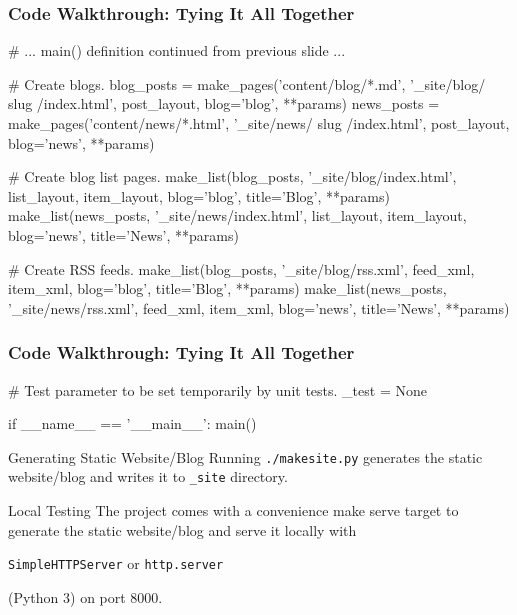 \documentclass{beamer}
\newcommand{\inlinecode}[1]{
    \colorbox{black!15}{%
        \texttt{#1}%
    }
}
\begin{document}
\begin{frame}[fragile]
\frametitle{Code Walkthrough: Tying It All Together}
\begin{pythoncode}
    # ... main() definition continued from previous slide ...

    # Create blogs.
    blog_posts = make_pages('content/blog/*.md',
                            '_site/blog/{{ slug }}/index.html',
                            post_layout, blog='blog', **params)
    news_posts = make_pages('content/news/*.html',
                            '_site/news/{{ slug }}/index.html',
                            post_layout, blog='news', **params)

    # Create blog list pages.
    make_list(blog_posts, '_site/blog/index.html',
              list_layout, item_layout, blog='blog', title='Blog', **params)
    make_list(news_posts, '_site/news/index.html',
              list_layout, item_layout, blog='news', title='News', **params)

    # Create RSS feeds.
    make_list(blog_posts, '_site/blog/rss.xml',
              feed_xml, item_xml, blog='blog', title='Blog', **params)
    make_list(news_posts, '_site/news/rss.xml',
              feed_xml, item_xml, blog='news', title='News', **params)
\end{pythoncode}
\end{frame}


\begin{frame}[fragile]
\frametitle{Code Walkthrough: Tying It All Together}
\begin{pythoncode}
# Test parameter to be set temporarily by unit tests.
_test = None

if __name__ == '__main__':
    main()
\end{pythoncode}

    \begin{block}{Generating Static Website/Blog}
        Running \inlinecode{./makesite.py} generates the static
        website/blog and writes it to \inlinecode{\_site} directory.
    \end{block}

    \begin{block}{Local Testing}
        The project comes with a convenience {{make serve}} target to
        generate the static website/blog and serve it locally with
        \inlinecode{SimpleHTTPServer} or \inlinecode{http.server}
        (Python 3) on port 8000.
    \end{block}

\end{frame}
\end{document}
